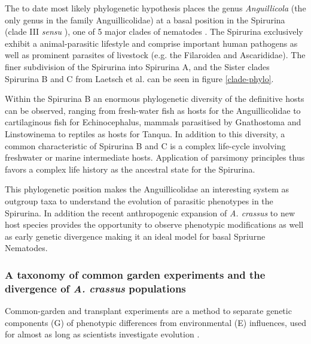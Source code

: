The to date most likely phylogenetic hypothesis places the genus
\textit{Anguillicola} (the only genus in the family Anguillicolidae)
at a basal position in the Spirurina (clade III \textit{sensu}
\cite{blaxter_molecular_1998}), one of 5 major clades of nematodes
\cite{nadler_molecular_2007, wijov_evolutionary_2006}. The Spirurina
exclusively exhibit a animal-parasitic lifestyle and comprise
important human pathogens as well as prominent parasites of livestock
(e.g. the Filaroidea and Ascarididae). The finer subdivision of the
Spirurina into Spirurina A, and the Sister clades Spirurina B and C
from Laetsch et al. can be seen in figure \ref{clade-phylo}.


Within the Spirurina B an enormous phylogenetic diversity of the
definitive hosts can be observed, ranging from fresh-water fish as
hosts for the Anguillicolidae to cartilaginous fish for
Echinocephalus, mammals parasitised by Gnathostoma and Linstowinema to
reptiles as hosts for Tanqua. In addition to this diversity, a common
characteristic of Spirurina B and C is a complex life-cycle involving
freshwater or marine intermediate hosts. Application of parsimony
principles thus favors a complex life history as the ancestral state
for the Spirurina.

This phylogenetic position makes the Anguillicolidae an interesting
system as outgroup taxa to understand the evolution of parasitic
phenotypes in the Spirurina. In addition the recent anthropogenic
expansion of \textit{A. crassus} to new host species provides the
opportunity to observe phenotypic modifications as well as early
genetic divergence making it an ideal model for basal Spriurne
Nematodes.

\subsubsection{A taxonomy of common garden experiments and the
  divergence of \textit{A. crassus} populations}
\label{div-ac}

Common-garden and transplant experiments are a method to separate
genetic components (G) of phenotypic differences from environmental
(E) influences, used for almost as long as scientists investigate
evolution \cite{kerner_classic_common_garden,
  bonnier_classic_common_garden}.


